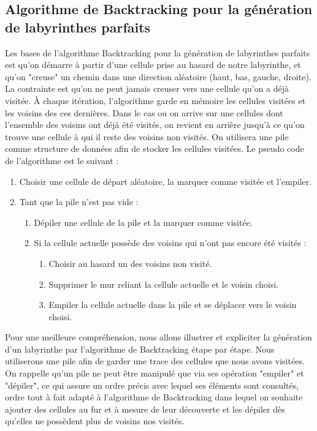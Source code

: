 \subsection{Algorithme de Backtracking pour la génération de labyrinthes parfaits}
Les bases de l'algorithme Backtracking pour la génération de labyrinthes parfaits est qu'on démarre à partir d'une cellule prise au hasard de notre labyrinthe, et qu'on "creuse" un chemin dans une direction aléatoire (haut, bas, gauche, droite). La contrainte est qu'on ne peut jamais creuser vers une cellule qu'on a déjà visitée. À chaque itération, l'algorithme garde en mémoire les cellules visitées et les voisins des ces dernières. Dans le cas ou on arrive sur une cellules dont l'ensemble des voisins ont déjà été visités, on revient en arrière jusqu'à ce qu'on trouve une cellule à qui il reste des voisins non visités. On utilisera une pile comme structure de données afin de stocker les cellules visitées. Le pseudo code de l'algorithme est le suivant : 
\newline
\begin{enumerate}
    \item Choisir une cellule de départ aléatoire, la marquer comme visitée et l'empiler.
    \item Tant que la pile n'est pas vide :
    \begin{enumerate}
        \item Dépiler une cellule de la pile et la marquer comme visitée.
        \item Si la cellule actuelle possède des voisins qui n'ont pas encore été visités :
        \begin{enumerate}
            \item Choisir au hasard un des voisins non visité. \item Supprimer le mur reliant la cellule actuelle et le voisin choisi.
            \item Empiler la cellule actuelle dans la pile et se déplacer vers le voisin choisi.
            \newline
        \end{enumerate}
    \end{enumerate}
\end{enumerate}

Pour une meilleure compréhension, nous allons illustrer et expliciter la génération d'un labyrinthe par l'algorithme de Backtracking étape par étape. Nous utiliserons une pile afin de garder une trace des cellules que nous avons visitées.
On rappelle qu'un pile ne peut être manipulé que via ses opération "empiler" et "dépiler", ce qui assure un ordre précis avec lequel ses éléments sont consultés, ordre tout à fait adapté à l'algorithme de Backtracking dans lequel on souhaite ajouter des cellules au fur et à mesure de leur découverte et les dépiler dès qu'elles ne possèdent plus de voisins nos visités.

